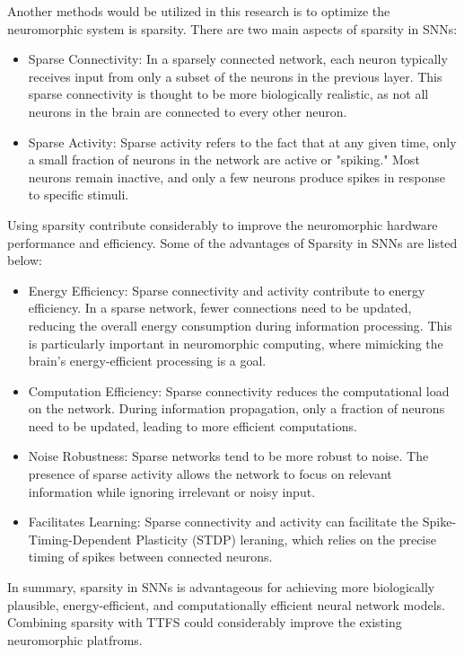 \begin {itemize}
\begin{itemize}
Another methods would be utilized in this research is to optimize the neuromorphic system is sparsity. 
There are two main aspects of sparsity in SNNs:
    \begin{itemize}
    \item[]   Sparse Connectivity:
    In a sparsely connected network, each neuron typically receives input from only a subset of the neurons in the previous layer. This sparse connectivity is thought to be more biologically realistic, as not all neurons in the brain are connected to every other neuron.
    \item[]   Sparse Activity:
    Sparse activity refers to the fact that at any given time, only a small fraction of neurons in the network are active or "spiking." Most neurons remain inactive, and only a few neurons produce spikes in response to specific stimuli.
    \end{itemize}
Using sparsity contribute considerably to improve the neuromorphic hardware performance and efficiency. Some of the advantages of Sparsity in SNNs are listed below:
    \begin{itemize}
        \item[] Energy Efficiency:
        Sparse connectivity and activity contribute to energy efficiency. In a sparse network, fewer connections need to be updated, reducing the overall energy consumption during information processing. This is particularly important in neuromorphic computing, where mimicking the brain's energy-efficient processing is a goal.
        \item[] Computation Efficiency:
        Sparse connectivity reduces the computational load on the network. During information propagation, only a fraction of neurons need to be updated, leading to more efficient computations.
        \item[]    Noise Robustness:
        Sparse networks tend to be more robust to noise. The presence of sparse activity allows the network to focus on relevant information while ignoring irrelevant or noisy input. 
        \item[]
        Facilitates Learning:
        Sparse connectivity and activity can facilitate the  Spike-Timing-Dependent Plasticity (STDP) leraning, which relies on the precise timing of spikes between connected neurons.
    \end{itemize}  
In summary, sparsity in SNNs is advantageous for achieving more biologically plausible, energy-efficient, and computationally efficient neural network models. Combining sparsity with TTFS could considerably improve the existing neuromorphic platfroms. 

\end{itemize}
\end{itemize}
